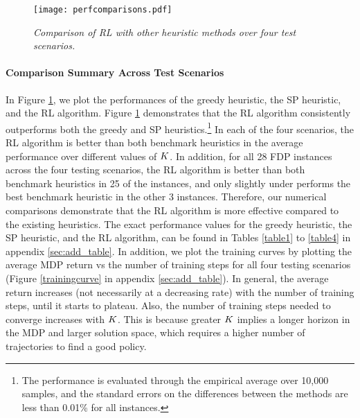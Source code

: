 \documentclass{article} %
\begin{document}





\begin{figure}[t!]
\centering
 \texttt{[image: perfcomparisons.pdf]}
\caption{\textit{Comparison of RL with other heuristic methods over four test scenarios.}\label{fig:compare}}
\vspace{-6mm}
\end{figure}


\paragraph{Comparison Summary Across Test Scenarios}
In Figure \ref{fig:compare}, we plot the performances of the greedy heuristic, the SP heuristic, and the RL algorithm. Figure \ref{fig:compare} demonstrates that the RL algorithm consistently outperforms both the greedy and SP heuristics.\footnote{The performance is evaluated through the empirical average over 10,000 samples, and the standard errors on the differences between the methods are less than 0.01\% for all instances.} In each of the four scenarios, the RL algorithm is better than both benchmark heuristics in the average performance over different values of $K$. In addition, for all 28 FDP instances across the four testing scenarios, the RL algorithm is better than both benchmark heuristics in 25 of the instances, and only slightly under performs the best benchmark heuristic in the other 3 instances. Therefore, our numerical comparisons demonstrate that the RL algorithm is more effective compared to the existing heuristics. The exact performance values for the greedy heuristic, the SP heuristic, and the RL algorithm, can be found in Tables \ref{table1} to \ref{table4} in appendix \ref{sec:add_table}. In addition, we plot the training curves by plotting the average MDP return vs the number of training steps for all four testing scenarios (Figure \ref{trainingcurve} in appendix \ref{sec:add_table}). In general, the average return increases (not necessarily at a decreasing rate) with the number of training steps, until it starts to plateau. Also, the number of training steps needed to converge increases with $K$. This is because greater $K$ implies a longer horizon in the MDP and larger solution space, which requires a higher number of trajectories to find a good policy.
\end{document}
